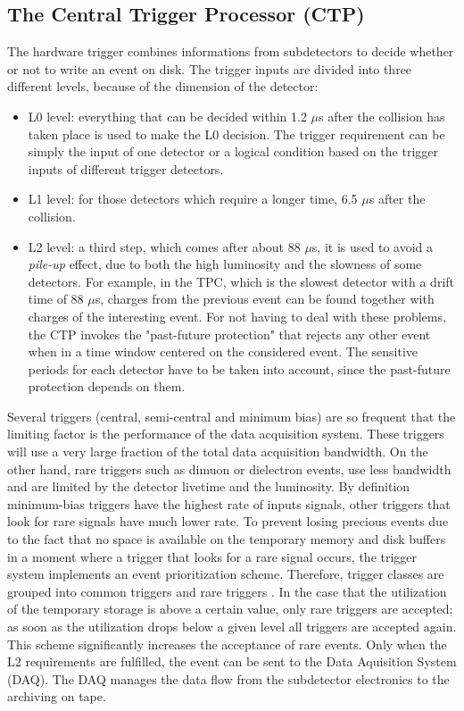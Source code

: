 \subsection{The Central Trigger Processor (CTP)}
The hardware trigger combines informations from subdetectors to decide whether or not to write an event on disk. The trigger inputs are divided into three different levels, because of the dimension of the detector:
\begin{itemize}
\item L0 level: everything that can be decided within 1.2 $\mu$s after the collision has taken place is used to make the L0 decision. The trigger requirement can be simply the input of one detector or a logical condition based on the trigger inputs of different trigger detectors.
\item L1 level: for those detectors which require a longer time, 6.5 $\mu$s after the collision.
\item L2 level: a third step, which comes after about 88 $\mu$s, it is used to avoid a \textit{pile-up} effect, due to both the high luminosity and the slowness of some detectors. For example, in the TPC, which is the slowest detector with a drift time of 88 $\mu$s, charges from the previous event can be found together with charges of the interesting event. For not having to deal with these problems, the CTP invokes the "past-future protection" that rejects any other event when in a time window centered on the considered event. The sensitive periods for each detector have to be taken into account, since the past-future protection depends on them.
\end{itemize}
Several triggers (central, semi-central and minimum bias) are so frequent that the limiting factor is the performance of the data acquisition system. These triggers will use a very large fraction of the total data acquisition bandwidth. On the other hand, rare triggers such as dimuon or dielectron events, use less bandwidth and are limited by the detector livetime and the luminosity. By definition minimum-bias triggers have the highest rate of inputs signals, other triggers that look for rare signals have much lower rate. To prevent losing precious events due to the fact that no space is available on the temporary memory and disk buffers in a moment where a trigger that looks for a rare signal occurs, the trigger system implements an event prioritization scheme. Therefore, trigger classes are grouped into common triggers and rare triggers \cite{trigger2}. In the case that the utilization of the temporary storage is above a certain value, only rare triggers are accepted; as soon as the utilization drops below a given level all triggers are accepted again. This scheme significantly increases the acceptance of rare events.
Only when the L2 requirements are fulfilled, the event can be sent to the Data Aquisition System (DAQ). The DAQ manages the data flow from the subdetector electronics to the archiving on tape.

